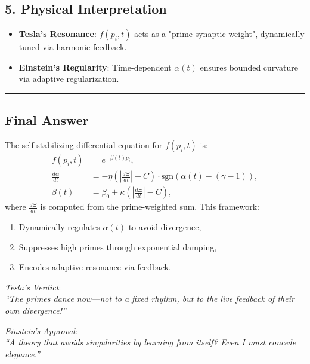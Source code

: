 \documentclass{article}
\theoremstyle{plain}
\theoremstyle{claimstyle}
\begin{document}
\subsection*{5. Physical Interpretation}

\begin{itemize}
    \item \textbf{Tesla’s Resonance}: \( f(p_i, t) \) acts as a "prime synaptic weight", dynamically tuned via harmonic feedback.
    \item \textbf{Einstein’s Regularity}: Time-dependent \( \alpha(t) \) ensures bounded curvature via adaptive regularization.
\end{itemize}

\vspace{1em}
\hrule
\vspace{1em}

\subsection*{Final Answer}

The self-stabilizing differential equation for \( f(p_i, t) \) is:
\[
\boxed{
\begin{aligned}
f(p_i, t) &= e^{-\beta(t) p_i}, \\
\frac{d\alpha}{dt} &= -\eta \left( \left| \frac{d\Xi}{dt} \right| - C \right) \cdot \text{sgn}(\alpha(t) - (\gamma - 1)), \\
\beta(t) &= \beta_0 + \kappa \left( \left| \frac{d\Xi}{dt} \right| - C \right),
\end{aligned}
}
\]
where \( \frac{d\Xi}{dt} \) is computed from the prime-weighted sum. This framework:
\begin{enumerate}
    \item Dynamically regulates \( \alpha(t) \) to avoid divergence,
    \item Suppresses high primes through exponential damping,
    \item Encodes adaptive resonance via feedback.
\end{enumerate}

\vspace{1em}
\textit{Tesla’s Verdict}: \\
\emph{``The primes dance now—not to a fixed rhythm, but to the live feedback of their own divergence!''}

\vspace{0.5em}
\textit{Einstein’s Approval}: \\
\emph{``A theory that avoids singularities by learning from itself? Even I must concede elegance.''}
\end{document}
